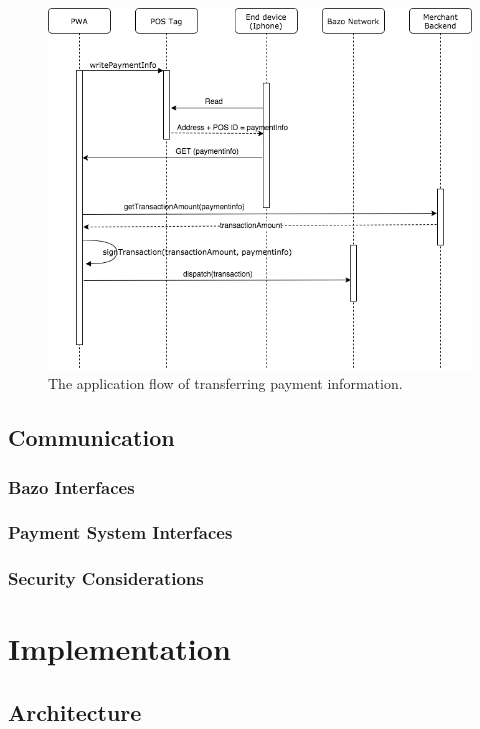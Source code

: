 \documentclass[a4paper]{article}
\begin{document}
\begin{figure}
\centering
\includegraphics[width=1\textwidth]{diagrams/POS_flow.png}
\caption{\label{fig:POS}The application flow of transferring payment information.}
\end{figure}

\subsection{Communication}
\subsubsection{Bazo Interfaces}
\subsubsection{Payment System Interfaces}

\subsubsection{Security Considerations}

\newpage

\section{Implementation}
\subsection{Architecture}
\end{document}
